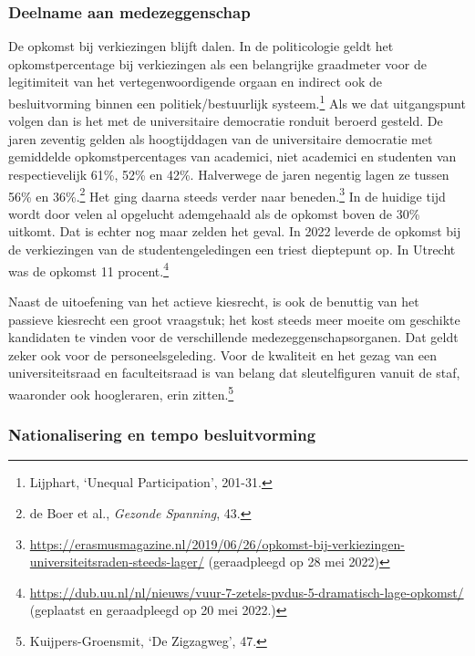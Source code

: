 \documentclass[smallauthor, chapterhaspagenum, nochapterinheader, pagenuminheader,  bigchapnum,medium2, tocpages, garamond, titleinheader]{jote-book}
\begin{document}
	\subsubsection{Deelname aan medezeggenschap }



	De opkomst bij verkiezingen blijft dalen. In de politicologie geldt het opkomstpercentage bij verkiezingen als een belangrijke graadmeter voor de legitimiteit van het vertegenwoordigende orgaan en indirect ook de besluitvorming binnen een politiek/bestuurlijk systeem.\footnote{Lijphart, ‘Unequal Participation', 201-31.} Als we dat uitgangspunt volgen dan is het met de universitaire democratie ronduit beroerd gesteld. De jaren zeventig gelden als hoogtijddagen van de universitaire democratie met gemiddelde opkomstpercentages van academici, niet academici en studenten van respectievelijk 61\%, 52\% en 42\%. Halverwege de jaren negentig lagen ze tussen 56\% en 36\%.\footnote{de Boer et al., \emph{Gezonde Spanning}, 43.} Het ging daarna steeds verder naar beneden.\footnote{\href{https://erasmusmagazine.nl/2019/06/26/opkomst-bij-verkiezingen-universiteitsraden-steeds-lager/}{https://erasmusmagazine.nl/2019/06/26/opkomst-bij-verkiezingen-universiteitsraden-steeds-lager/} (geraadpleegd op 28 mei 2022)} In de huidige tijd wordt door velen al opgelucht ademgehaald als de opkomst boven de 30\% uitkomt. Dat is echter nog maar zelden het geval. In 2022 leverde de opkomst bij de verkiezingen van de studentengeledingen een triest dieptepunt op. In Utrecht was de opkomst 11 procent.\footnote{\href{https://dub.uu.nl/nl/nieuws/vuur-7-zetels-pvdus-5-dramatisch-lage-opkomst/}{https://dub.uu.nl/nl/nieuws/vuur-7-zetels-pvdus-5-dramatisch-lage-opkomst/} (geplaatst en geraadpleegd op 20 mei 2022.)}



	Naast de uitoefening van het actieve kiesrecht, is ook de benuttig van het passieve kiesrecht een groot vraagstuk; het kost steeds meer moeite om geschikte kandidaten te vinden voor de verschillende medezeggenschapsorganen. Dat geldt zeker ook voor de personeelsgeleding. Voor de kwaliteit en het gezag van een universiteitsraad en faculteitsraad is van belang dat sleutelfiguren vanuit de staf, waaronder ook hoogleraren, erin zitten.\footnote{Kuijpers-Groensmit, ‘De Zigzagweg', 47.}



	\subsubsection{Nationalisering en tempo besluitvorming}
\end{document}
